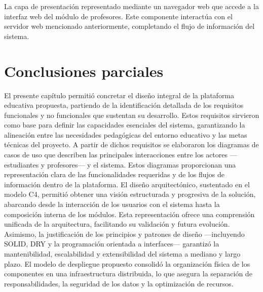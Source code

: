 La capa de presentación representado mediante un navegador web que accede a la interfaz web del módulo de profesores. Este componente interactúa con el servidor web mencionado anteriormente, completando el flujo de información del sistema.



\section{Conclusiones parciales}

El presente capítulo permitió concretar el diseño integral de la plataforma educativa propuesta, partiendo de la identificación detallada de los requisitos funcionales y no funcionales que sustentan su desarrollo. Estos requisitos sirvieron como base para definir las capacidades esenciales del sistema, garantizando la alineación entre las necesidades pedagógicas del entorno educativo y las metas técnicas del proyecto. A partir de dichos requisitos se elaboraron los diagramas de casos de uso que describen las principales interacciones entre los actores —estudiantes y profesores— y el sistema. Estos diagramas proporcionan una representación clara de las funcionalidades requeridas y de los flujos de información dentro de la plataforma. El diseño arquitectónico, sustentado en el modelo C4, permitió obtener una visión estructurada y progresiva de la solución, abarcando desde la interacción de los usuarios con el sistema hasta la composición interna de los módulos. Esta representación ofrece una comprensión unificada de la arquitectura, facilitando su validación y futura evolución. Asimismo, la justificación de los principios y patrones de diseño —incluyendo SOLID, DRY y la programación orientada a interfaces— garantizó la mantenibilidad, escalabilidad y extensibilidad del sistema a mediano y largo plazo. El modelo de despliegue propuesto consolidó la organización física de los componentes en una infraestructura distribuida, lo que asegura la separación de responsabilidades, la seguridad de los datos y la optimización de recursos.
